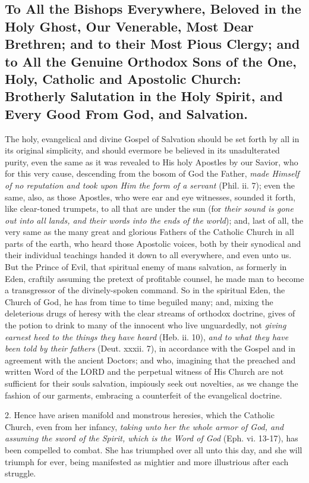 \subsection{To All the Bishops Everywhere, Beloved in the Holy Ghost, Our Venerable, Most Dear Brethren; and to their Most Pious Clergy; and to All the Genuine Orthodox Sons of the One, Holy, Catholic and Apostolic Church: Brotherly Salutation in the Holy Spirit, and Every Good From God, and Salvation.}

The holy, evangelical and divine Gospel of Salvation should be set forth
by all in its original simplicity, and should evermore be believed in
its unadulterated purity, even the same as it was revealed to His holy
Apostles by our Savior, who for this very cause, descending from the
bosom of God the Father, \emph{made Himself of no reputation and took
upon Him the form of a servant} (Phil. ii. 7); even the same, also, as
those Apostles, who were ear and eye witnesses, sounded it forth, like
clear-toned trumpets, to all that are under the sun (for \emph{their
sound is gone out into all lands, and their words into the ends of the
world}); \emph{} and, last of all, the very same as the many great and
glorious Fathers of the Catholic Church in all parts of the earth, who
heard those Apostolic voices, both by their synodical and their
individual teachings handed it down to all everywhere, and even unto us.
But the Prince of Evil, that spiritual enemy of man\textquotesingle s
salvation, as formerly in Eden, craftily assuming the pretext of
profitable counsel, he made man to become a transgressor of the
divinely-spoken command. So in the spiritual Eden, the Church of God, he
has from time to time beguiled many; and, mixing the deleterious drugs
of heresy with the clear streams of orthodox doctrine, gives of the
potion to drink to many of the innocent who live unguardedly, not
\emph{giving earnest heed to the things they have heard} (Heb. ii. 10),
\emph{and to what they have been told by their fathers} (Deut. xxxii.
7), in accordance with the Gospel and in agreement with the ancient
Doctors; and who, imagining that the preached and written Word of the
LORD and the perpetual witness of His Church are not sufficient for
their souls\textquotesingle{} salvation, impiously seek out novelties,
as we change the fashion of our garments, embracing a counterfeit of the
evangelical doctrine.

2. Hence have arisen manifold and monstrous heresies, which the Catholic
Church, even from her infancy, \emph{taking unto her the whole armor of
God, and assuming the sword of the Spirit, which is the Word of God}
(Eph. vi. 13-17), has been compelled to combat. She has triumphed over
all unto this day, and she will triumph for ever, being manifested as
mightier and more illustrious after each struggle.

